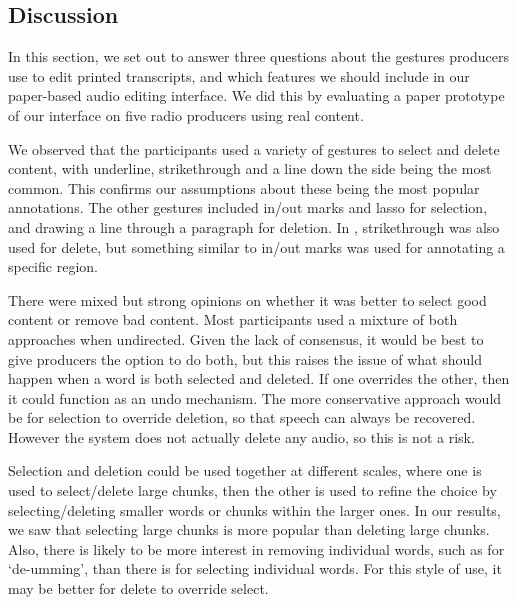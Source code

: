 \subsection{Discussion}

In this section, we set out to answer three questions about the gestures producers use to edit printed transcripts, and
which features we should include in our paper-based audio editing interface. We did this by evaluating a paper
prototype of our interface on five radio producers using real content.


We observed that the participants used a variety of gestures to select and delete content, with underline,
strikethrough and a line down the side being the most common.  This confirms our assumptions about these being the most
popular annotations. The other gestures included in/out marks and lasso for selection, and drawing a line through a
paragraph for deletion.  In \citet{Weibel2008}, strikethrough was also used for delete, but something similar to in/out
marks was used for annotating a specific region.

There were mixed but strong opinions on whether it was better to select good content or remove bad content.  Most
participants used a mixture of both approaches when undirected. Given the lack of consensus, it would be best to give
producers the option to do both, but this raises the issue of what should happen when a word is both selected and
deleted.  If one overrides the other, then it could function as an undo mechanism. The more conservative approach would
be for selection to override deletion, so that speech can always be recovered. However the system does not actually
delete any audio, so this is not a risk.

Selection and deletion could be used together at different scales, where one is used to select/delete large chunks,
then the other is used to refine the choice by selecting/deleting smaller words or chunks within the larger ones. In
our results, we saw that selecting large chunks is more popular than deleting large chunks. Also, there is likely to be
more interest in removing individual words, such as for `de-umming', than there is for selecting individual words. For
this style of use, it may be better for delete to override select.

